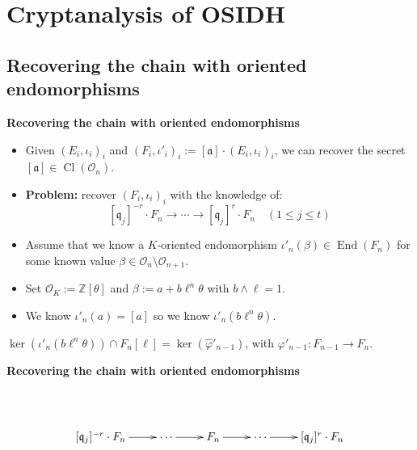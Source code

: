\documentclass[10pt]{beamer}
\theoremstyle{plain}
\theoremstyle{definition}
\newcommand{\Z}{\mathbb{Z}}
\newcommand{\mO}{\mathcal{O}}
\renewcommand{\(}{\left(}
\renewcommand{\)}{\right)}
\newcommand{\mf}[1]{\mathfrak{#1}}
\newcommand{\mfq}{\mathfrak{q}}
\DeclareMathOperator{\End}{End}
\DeclareMathOperator{\Cl}{Cl}
\begin{document}
\section{Cryptanalysis of OSIDH}

\subsection{Recovering the chain with oriented endomorphisms}

\begin{frame}
\textbf{Recovering the chain with oriented endomorphisms}

\vspace{0.5cm}

\begin{itemize}
\item Given $(E_i,\iota_i)_{i}$ and $(F_i,\iota'_i)_{i}:=[\mf{a}]\cdot(E_i,\iota_i)_{i}$, we can recover the secret $[\mf{a}]\in\Cl(\mO_n)$.

\pause

\item \textbf{Problem:} recover $(F_i,\iota_i)_{i}$ with the knowledge of:
\[[\mfq_j]^{-r}\cdot F_{n}\longrightarrow \cdots\longrightarrow [\mfq_j]^{r}\cdot F_{n} \quad (1\leq j\leq t)\]

\pause

\item Assume that we know a $K$-oriented endomorphism $\iota'_n(\beta)\in\End(F_n)$ for some known value $\beta\in\mO_n\setminus\mO_{n+1}$.

\pause

\item Set $\mO_K:=\Z[\theta]$ and $\beta:=a+b\ell^n\theta$ with $b\wedge\ell=1$.

\item We know $\iota'_n(a)=[a]$ so we know $\iota'_n(b\ell^n\theta)$.
\end{itemize}

\pause

\begin{lemma}
$\ker(\iota'_n(b\ell^n\theta))\cap F_n[\ell]=\ker(\widehat{\varphi}'_{n-1})$, with $\varphi'_{n-1}:F_{n-1}\longrightarrow F_n$.
\end{lemma}

\end{frame}

\begin{frame}
\textbf{Recovering the chain with oriented endomorphisms}

\vspace{0.5cm}

\[\xymatrix{
 										      &                     &  & &\\
[\mf{q}_j]^{-r}\cdot F_n \ar[r] & \cdots \ar[r]& F_n \ar[r] & \cdots \ar[r]& [\mf{q}_j]^r\cdot F_n\\
}\]
\end{frame}
\end{document}
